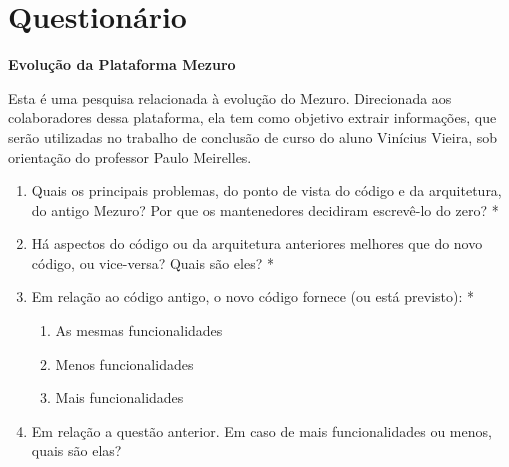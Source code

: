 


\newpage
\appendix
\section{Questionário} 
\label{form-pesquisa}

\textbf{{\large Evolução da Plataforma Mezuro}}

\begin{mdframed}
Esta é uma pesquisa relacionada à evolução do Mezuro. Direcionada aos colaboradores dessa plataforma, ela tem como objetivo extrair informações, que serão utilizadas no trabalho de conclusão de curso do aluno Vinícius Vieira, sob orientação do professor Paulo Meirelles.
\end{mdframed}

\begin{enumerate}
\item Quais os principais problemas, do ponto de vista do código e da arquitetura, do antigo Mezuro? Por que os mantenedores decidiram escrevê-lo do zero? *
\item Há aspectos do código ou da arquitetura anteriores melhores que do novo código, ou vice-versa? Quais são eles? *
\item Em relação ao código antigo, o novo código fornece (ou está previsto): *
  \begin{enumerate}
  \item As mesmas funcionalidades
  \item Menos funcionalidades
  \item Mais funcionalidades 
  \end{enumerate}
\item Em relação a questão anterior. Em caso de mais funcionalidades ou menos, quais são elas? 
\end{enumerate}

